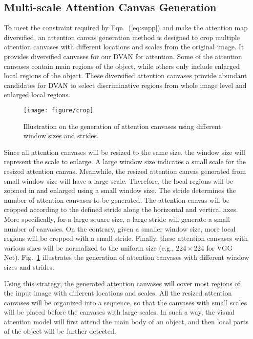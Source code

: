 \documentclass[journal]{IEEEtran}
\begin{document}
\subsection{Multi-scale Attention Canvas Generation}
\label{sec:Multiscale}

To meet the constraint required by Eqn.~(\ref{eq:supp}) and make the attention map diversified, an attention canvas generation method is designed to crop multiple attention canvases with different locations and scales from the original image. It provides diversified canvases for our DVAN for attention. Some of the attention canvases contain main regions of the object, while others only include enlarged local regions of the object. These diversified attention canvases provide abundant candidates for DVAN to select discriminative regions from whole image level and enlarged local regions.

\begin{figure}[!t]
  \centering
  \texttt{[image: figure/crop]}
  \vspace{-0.25in}
  \caption{Illustration on the generation of attention canvases using different window sizes and strides.}
  \label{fig:crop}
  \vspace{-0.2in}
\end{figure}

Since all attention canvases will be resized to the same size, the window size will represent the scale to enlarge. A large window size indicates a small scale for the resized attention canvas. Meanwhile, the resized attention canvas generated from small window size will have a large scale. Therefore, the local regions will be zoomed in and enlarged using a small window size. The stride determines the number of attention canvases to be generated. The attention canvas will be cropped according to the defined stride along the horizontal and vertical axes. More specifically, for a large square size, a large stride will generate a small number of canvases. On the contrary, given a smaller window size, more local regions will be cropped with a small stride. Finally, these attention canvases with various sizes will be normalized to the uniform size (e.g., $224 \times 224$ for VGG Net).
Fig.~\ref{fig:crop} illustrates the generation of attention canvases with different window sizes and strides.

Using this strategy, the generated attention canvases will cover most regions of the input image with different locations and scales. All the resized attention canvases will be organized into a sequence, so that the canvases with small scales will be placed before the canvases with large scales. In such a way, the visual attention model will first attend the main body of an object, and then local parts of the object will be further detected.
\end{document}
